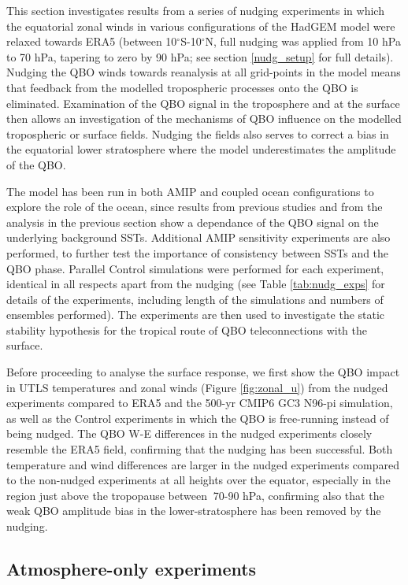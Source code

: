This section investigates results from a series of nudging experiments in which the equatorial zonal winds in various configurations of the HadGEM model were relaxed towards ERA5 (between 10$^\circ$S-10$^\circ$N, full nudging was applied from 10 hPa to 70 hPa, tapering to zero by 90 hPa; see section \ref{nudg_setup} for full details). Nudging the QBO winds towards reanalysis at all grid-points in the model means that feedback from the modelled tropospheric processes onto the QBO is eliminated. Examination of the QBO signal in the troposphere and at the surface then allows an investigation of the mechanisms of QBO influence on the modelled tropospheric or surface fields. Nudging the fields also serves to correct a bias in the equatorial lower stratosphere where the model underestimates the amplitude of the QBO.

 The model has been run in both AMIP and coupled ocean configurations to explore the role of the ocean, since results from previous studies \citep{nie2015} and from the analysis in the previous section show a dependance of the QBO signal on the underlying background SSTs. Additional AMIP sensitivity experiments are also performed, to further test the importance of consistency between SSTs and the QBO phase. Parallel Control simulations were performed for each experiment, identical in all respects apart from the nudging (see Table \ref{tab:nudg_exps} for details of the experiments, including length of the simulations and numbers of ensembles performed).  The experiments are then used to investigate the static stability hypothesis for the tropical route of QBO teleconnections with the surface.  

Before proceeding to analyse the surface response, we first show the QBO impact in UTLS  
temperatures and zonal winds (Figure \ref{fig:zonal_u}) from the nudged experiments compared to ERA5 and the 500-yr CMIP6 GC3 N96-pi simulation, as well as the Control experiments in which the QBO is free-running instead of being nudged.  The QBO W-E differences in the nudged experiments closely resemble the ERA5 field, confirming that the nudging has been successful. Both temperature and wind differences are larger in the nudged experiments compared to the non-nudged experiments at all heights over the equator, especially in the region just above the tropopause between $~$70-90 hPa, confirming also that the weak QBO amplitude bias in the lower-stratosphere has  
been removed by the nudging.  

\subsection{Atmosphere-only experiments}



